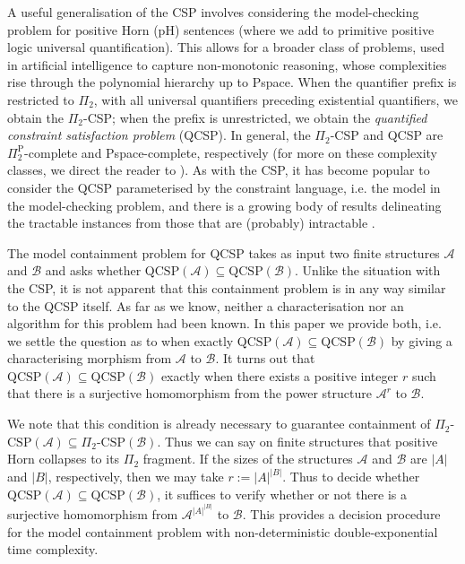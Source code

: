 \documentclass{LMCS}
\begin{document}
A useful generalisation of the CSP involves considering the model-checking problem for positive Horn (pH)  sentences (where we add to primitive positive logic universal quantification). This allows for a broader class of problems, used in artificial intelligence to capture non-monotonic reasoning, whose complexities rise through the polynomial hierarchy up to Pspace. 
When the quantifier prefix is restricted to $\Pi_2$, with all universal quantifiers preceding existential quantifiers, we obtain the $\Pi_2$-CSP; when the prefix is unrestricted, we obtain the \emph{quantified constraint satisfaction problem} (QCSP). In general, the $\Pi_2$-CSP and QCSP  are $\Pi^{\mathrm{P}}_{2}$-complete and Pspace-complete, respectively (for more on these complexity classes, we direct the reader to \cite{ComputationalComplexity}).
As with the CSP, it has become popular to consider the QCSP parameterised by the constraint language, \mbox{i.e.} the model in the model-checking problem, and there is a growing body of results delineating the tractable instances from those that are (probably) intractable \cite{OxfordQuantifiedConstraints,chen-2006}. 

The model containment problem for QCSP takes as input two finite structures $\mathcal{A}$ and $\mathcal{B}$ and asks whether $\mathrm{QCSP}(\mathcal{A}) \subseteq \mathrm{QCSP}(\mathcal{B})$. Unlike the situation with the CSP, it is not apparent that this containment problem is in any way similar to the QCSP itself. As far as we know, neither a characterisation nor an algorithm for this problem had been known. In this paper we provide both, \mbox{i.e.} we settle the question as to when exactly $\mathrm{QCSP}(\mathcal{A}) \subseteq \mathrm{QCSP}(\mathcal{B})$ by giving a characterising morphism from $\mathcal{A}$ to $\mathcal{B}$.  It turns out that $\mathrm{QCSP}(\mathcal{A}) \subseteq \mathrm{QCSP}(\mathcal{B})$ exactly when there exists a positive integer $r$ such that  there is a surjective homomorphism from the power structure $\mathcal{A}^r$ to $\mathcal{B}$. 

We note that this condition is already necessary to guarantee containment of $\Pi_2$-$\mathrm{CSP}(\mathcal{A}) \subseteq \Pi_2$-$\mathrm{CSP}(\mathcal{B})$. Thus we can say on finite structures that positive Horn collapses to its $\Pi_2$ fragment. If the sizes of the structures $\mathcal{A}$ and $\mathcal{B}$ are $|A|$ and $|B|$, respectively, then we may take $r:=|A|^{|B|}$. Thus to decide whether $\mathrm{QCSP}(\mathcal{A}) \subseteq \mathrm{QCSP}(\mathcal{B})$, it suffices to verify whether or not there is a surjective homomorphism from $\mathcal{A}^{|A|^{|B|}}$ to $\mathcal{B}$. This provides a decision procedure for the model containment problem with non-deterministic double-exponential time complexity.
\end{document}
